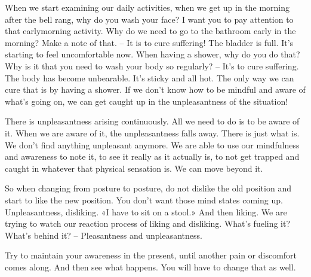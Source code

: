 \documentclass[letterpaper,10pt,english]{sphinxmanual}
\begin{document}
\sphinxAtStartPar
When we start examining our daily activities, when we get up in the
morning after the bell rang, why do you wash your face? I want you to pay
attention to that early\sphinxhyphen{}morning activity. Why do we need to go to the bathroom  early  in  the  morning?  Make  a  note  of  that.  –  It  is  to  cure  suffering!
The  bladder  is  full.  It’s  starting  to  feel  uncomfortable  now.  When  having
a shower, why do you do that? Why is it that you need to wash your body
so regularly? – It’s to cure suffering. The body has become unbearable. It’s
sticky and all hot. The only way we can cure that is by having a shower. If
we don’t know how to be mindful and aware of what’s going on, we can get
caught up in the unpleasantness of the situation!

\sphinxAtStartPar
There is unpleasantness arising continuously. All we need to do is to be
aware of it. When we are aware of it, the unpleasantness falls away. There
is just what is. We don’t find anything unpleasant anymore. We are able to
use our mindfulness and awareness to note it, to see it really as it actually is,
to not get trapped and caught in whatever that physical sensation is. We can
move beyond it.

\sphinxAtStartPar
So when changing from posture to posture, do not dislike the old position  and  start  to  like  the  new  position.  You  don’t  want  those  mind  states
coming up. Unpleasantness, disliking. «I have to sit on a stool.» And then
liking. We are trying to watch our reaction process of liking and disliking.
  What’s fueling it? What’s behind it? – Pleasantness and unpleasantness.

\sphinxAtStartPar
Try to maintain your awareness in the present, until another pain or discomfort comes along. And then see what happens. You will have to change
that as well.
\end{document}
